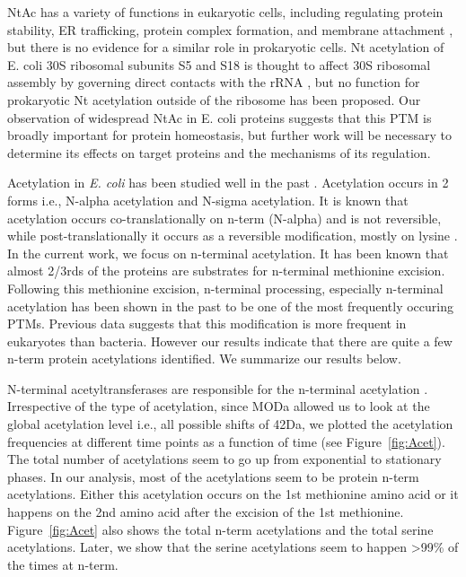 \documentclass[12pt]{article}
\begin{document}
NtAc has a variety of functions in eukaryotic cells, including regulating protein stability, ER trafficking, protein complex formation, and membrane attachment \cite{Starheimetal2012}, but there is no evidence for a similar role in prokaryotic cells. Nt acetylation of E. coli 30S ribosomal subunits S5 and S18 is thought to affect 30S ribosomal assembly by governing direct contacts with the rRNA \cite{ClatterbuckSoperetal2013}, but no function for prokaryotic Nt acetylation outside of the ribosome has been proposed. Our observation of widespread NtAc in E. coli proteins suggests that this PTM is broadly important for protein homeostasis, but further work will be necessary to determine its effects on target proteins and the mechanisms of its regulation. 
 
Acetylation in \emph{E. coli} has been studied well in the past \cite{Charbautetal2002} \cite{Gordiyenkoetal2008}. Acetylation occurs in 2 forms i.e., N-{alpha} acetylation and N-{sigma} acetylation. It is known that acetylation occurs co-translationally on n-term (N-{alpha}) and is not reversible, while post-translationally it occurs as a reversible modification, mostly on lysine \cite{Yuetal2008}. In the current work, we focus on n-terminal acetylation. It has been known that almost 2/3rds of the proteins are substrates for n-terminal methionine excision. Following this methionine excision, n-terminal processing, especially n-terminal acetylation \cite{Driessenetal1985} has been shown in the past to be one of the most frequently occuring PTMs. Previous data suggests that this modification is more frequent in eukaryotes than bacteria. However our results indicate that there are quite a few n-term protein acetylations identified. We summarize our results below. 

N-terminal acetyltransferases are responsible for the n-terminal acetylation \cite{Starheimetal2012}.  Irrespective of the type of acetylation, since MODa allowed us to look at the global acetylation level i.e., all possible shifts of 42Da, we plotted the acetylation frequencies at different time points as a function of time (see Figure~\ref{fig:Acet}). The total number of acetylations seem to go up from exponential to stationary phases. In our analysis, most of the acetylations seem to be protein n-term acetylations. Either this acetylation occurs on the 1st methionine amino acid or it happens on the 2nd amino acid after the excision of the 1st methionine. Figure~\ref{fig:Acet} also shows the total n-term acetylations and the total serine acetylations. Later, we show that the serine acetylations seem to happen >99\% of the times at n-term.
\end{document}
